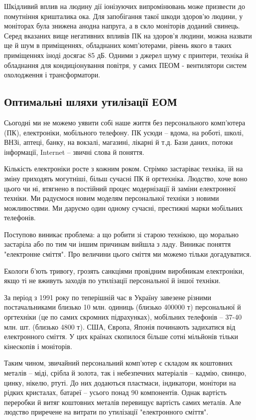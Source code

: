 Шкідливий вплив на людину дії іонізуючих випромінювань може призвести до помутніння кришталика ока. Для запобігання 
такої шкоди здоров’ю людини, у моніторах була знижена анодна напруга, а в скло моніторів доданий свинець.
Серед вказаних вище негативних впливів ПК на здоров’я людини, можна назвати ще й шум в приміщеннях, обладнаних комп'ютерами, 
рівень якого в таких приміщеннях іноді досягає 85 дБ. Одними з джерел шуму є принтери, техніка й обладнання для кондиціонування 
повітря, у самих ПЕОМ - вентилятори систем охолодження і трансформатори. 

\subsection{Оптимальні шляхи утилізації ЕОМ}
Сьогодні ми не можемо уявити собі наше життя без персонального комп’ютера (ПК), електроніки, мобільного телефону. ПК усюди – 
вдома, на роботі, школі, ВНЗі, аптеці, банку, на вокзалі, магазині, лікарні й т.д. Бази даних, потоки інформації, Internet – 
звичні слова й поняття. 

Кількість електроніки росте з кожним роком.  Стрімко застаріває техніка, їй на зміну приходять могутніші, більш сучасні ПК 
й оргтехніка. Людство, хоче воно цього чи ні, втягнено в постійний процес модернізації й заміни електронної техніки. Ми 
радуємося новим моделям персональної техніки з новими можливостями. Ми даруємо один одному сучасні, престижні марки мобільних телефонів.

Поступово виникає проблема: а що робити зі старою технікою, що морально застаріла або по тим чи іншим причинам вийшла з ладу. 
Виникає поняття "електронне сміття".  Про величини цього сміття ми можемо тільки догадуватися. 

Екологи б’ють тривогу, грозять санкціями провідним виробникам електроніки,  якщо ті не вживуть заходів по 
утилізації персональної й іншої техніки.

За період з 1991 року по теперішній час в Україну завезене різними постачальниками близько 10 млн. одиниць 
(близько 400000 т) персональної й оргтехніки (це по самих скромних підрахунках), мобільних телефонів – 37-40 
млн. шт. (близько 4800 т). США, Європа, Японія починають задихатися від електронного сміття. У цих країнах 
скопилося більше сотні мільйонів тільки кінескопів і моніторів.                                                                                                                      

Таким чином, звичайний персональний комп’ютер є складом як коштовних  металів – міді, срібла й золота, так і 
небезпечних матеріалів –  кадмію, свинцю, цинку, нікелю, ртуті. До них додаються пластмаси, індикатори, монітори 
на рідких кристалах, батареї – усього понад 90 компонентів. Однак вартість переробки  й витяг коштовних металів 
перевищує вартість самих металів. Але людство приречене на витрати по утилізації "електронного сміття".   

